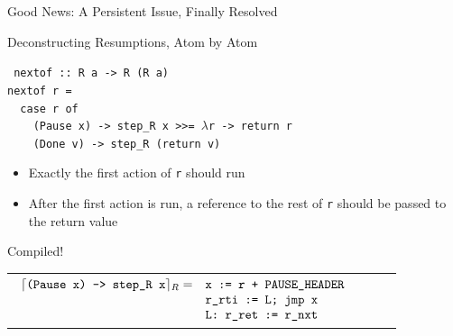 \documentclass{beamer}
\begin{document}
\begin{frame}{Good News: A Persistent Issue, Finally Resolved}

\begin{structure}{Deconstructing Resumptions, Atom by Atom}
\begin{onlinebox}{8cm}
\begin{flushleft}
\smallskip

\texttt{\scriptsize
{nextof :: R a -> R (R a)\\
nextof r =\\
\ \ case r of\\
\ \ \ \ (Pause x) -> step\_R x >>= $\lambda$r -> return r\\
\ \ \ \ (Done v) -> step\_R (return v)
}}

\end{flushleft}
\end{onlinebox}
\end{structure}

\begin{itemize}

\item{Exactly the first action of \texttt{r} should run}
\item{After the first action is run, a reference to the rest of \texttt{r} should be passed to the return value}

\end{itemize}

\pause

\begin{structure}{Compiled!}

\smallskip

\begin{tabular}[t]{llll}

$
\begin{array}[t]{llll}

\lceil \texttt{(Pause x) -> step\_R\ x}\rceil_R =& \texttt{x := r + PAUSE\_HEADER}\\
&\texttt{r\_rti := L; jmp x}\\
&\texttt{L: r\_ret := r\_nxt}

\end{array}
$
\end{tabular}

\end{structure}

\end{frame}
\end{document}

